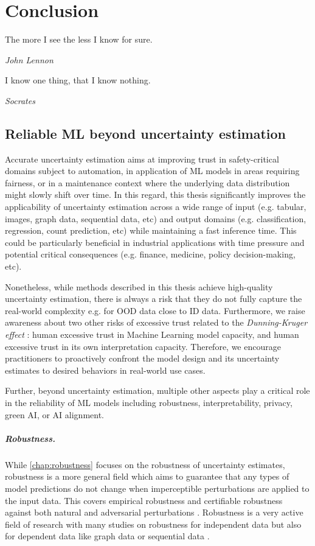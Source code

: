 \chapter{Conclusion}
\label{chap:conclusion}

\epigraph{The more I see the less I know for sure.}{\textit{John Lennon}}

\epigraph{I know one thing, that I know nothing.}{\textit{Socrates}}

\section{Reliable ML beyond uncertainty estimation}

Accurate uncertainty estimation aims at improving trust in safety-critical domains subject to automation, in application of ML models in areas requiring fairness, or in a maintenance context where the underlying data distribution might slowly shift over time. In this regard, this thesis significantly improves the applicability of uncertainty estimation across a wide range of input (e.g. tabular, images, graph data, sequential data, etc) and output domains (e.g. classification, regression, count prediction, etc) while maintaining a fast inference time. This could be particularly beneficial in industrial applications with time pressure and potential critical consequences (e.g. finance, medicine, policy decision-making, etc).

Nonetheless, while methods described in this thesis achieve high-quality uncertainty estimation, there is always a risk that they do not fully capture the real-world complexity e.g. for OOD data close to ID data. Furthermore, we raise awareness about two other risks of excessive trust related to the \emph{Dunning-Kruger effect} \citep{dunning-kruger}: human excessive trust in Machine Learning model capacity, and human excessive trust in its own interpretation capacity. Therefore, we encourage practitioners to proactively confront the model design and its uncertainty estimates to desired behaviors in real-world use cases.

Further, beyond uncertainty estimation, multiple other aspects play a critical role in the reliability of ML models including robustness, interpretability, privacy, green AI, or AI alignment.

\paragraph{Robustness.} While \cref*{chap:robustness} focuses on the robustness of uncertainty estimates, robustness is a more general field which aims to guarantee that any types of model predictions do not change when imperceptible perturbations are applied to the input data. This covers empirical robustness and certifiable robustness against both natural and adversarial perturbations \cite{tu2020empirical, chun2020empirical, cohen2019, zugner2020certifiable}. Robustness is a very active field of research with many studies on robustness for independent data \cite{silva2020opportunies} but also for dependent data like graph data \cite{GNNBook-ch8-gunnemann} or sequential data \cite{cheng2020}.

